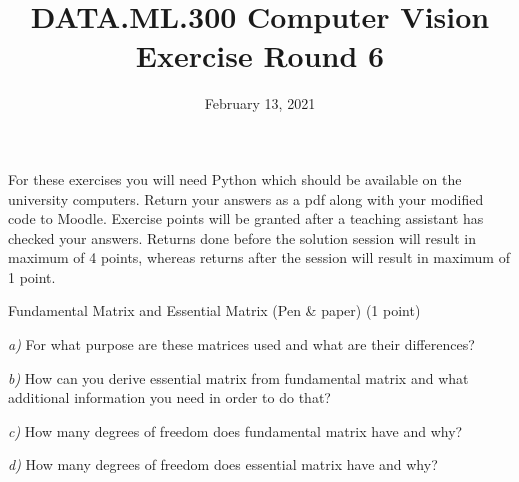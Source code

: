 \documentclass[12pt]{article} %
\title{DATA.ML.300 Computer Vision\\ Exercise Round 6}
\date{\vspace{-5mm} February 13, 2021}
\date{} %
\newenvironment{exercise}[2][Task]{\begin{trivlist}
\item[\hskip \labelsep {\bfseries #1}\hskip \labelsep {\bfseries #2.}]}{\end{trivlist}}
\begin{document}
\maketitle


\noindent For these exercises you will need Python which should be available on the university computers. Return your answers as a pdf along with your modified code to Moodle. Exercise points will be granted after a teaching assistant has checked your answers. Returns done before the solution session will result in maximum of 4 points, whereas returns after the session will result in maximum of 1 point. 
\newline


\begin{exercise}{1} 
Fundamental Matrix and Essential Matrix (Pen \& paper) (1 point)

\noindent 

\noindent \textit{a)} For what purpose are these matrices used and what are their differences?

\noindent \textit{b)} How can you derive essential matrix from fundamental matrix and what additional information you need in order to do that?

\noindent \textit{c)} How many degrees of freedom does fundamental matrix have and why?

\noindent \textit{d)} How many degrees of freedom does essential matrix have and why?

\end{exercise}
\end{document}
